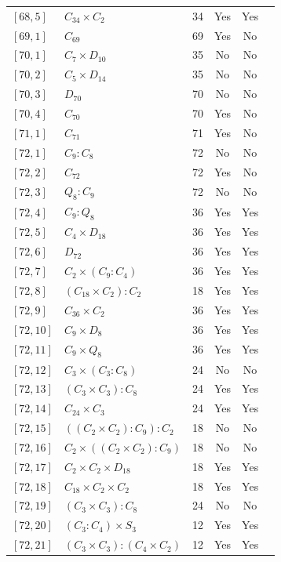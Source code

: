 \documentclass[12pt, a4paper]{article}
\theoremstyle{plain}
\theoremstyle{definition}
\begin{document}
\begin{longtable}{llcccl}
  $[68,5]$ & $C_{34} \times C_2$ & 34 & Yes & Yes \\
  $[69,1]$ & $C_{69}$ & 69 & Yes & No \\
  $[70,1]$ & $C_7 \times D_{10}$ & 35 & No & No \\
  $[70,2]$ & $C_5 \times D_{14}$ & 35 & No & No \\
  $[70,3]$ & $D_{70}$ & 70 & No & No \\
  $[70,4]$ & $C_{70}$ & 70 & Yes & No \\
  $[71,1]$ & $C_{71}$ & 71 & Yes & No \\
  $[72,1]$ & $C_9 : C_8$ & 72 & No & No \\
  $[72,2]$ & $C_{72}$ & 72 & Yes & No \\
  $[72,3]$ & $Q_8 : C_9$ & 72 & No & No \\
  $[72,4]$ & $C_9 : Q_8$ & 36 & Yes & Yes \\
  $[72,5]$ & $C_4 \times D_{18}$ & 36 & Yes & Yes \\
  $[72,6]$ & $D_{72}$ & 36 & Yes & Yes \\
  $[72,7]$ & $C_2 \times (C_9 : C_4)$ & 36 & Yes & Yes \\
  $[72,8]$ & $(C_{18} \times C_2) : C_2$ & 18 & Yes & Yes \\
  $[72,9]$ & $C_{36} \times C_2$ & 36 & Yes & Yes \\
  $[72,10]$ & $C_9 \times D_8$ & 36 & Yes & Yes \\
  $[72,11]$ & $C_9 \times Q_8$ & 36 & Yes & Yes \\
  $[72,12]$ & $C_3 \times (C_3 : C_8)$ & 24 & No & No \\
  $[72,13]$ & $(C_3 \times C_3) : C_8$ & 24 & Yes & Yes \\
  $[72,14]$ & $C_{24} \times C_3$ & 24 & Yes & Yes \\
  $[72,15]$ & $((C_2 \times C_2) : C_9) : C_2$ & 18 & No & No \\
  $[72,16]$ & $C_2 \times ((C_2 \times C_2) : C_9)$ & 18 & No & No \\
  $[72,17]$ & $C_2 \times C_2 \times D_{18}$ & 18 & Yes & Yes \\
  $[72,18]$ & $C_{18} \times C_2 \times C_2$ & 18 & Yes & Yes \\
  $[72,19]$ & $(C_3 \times C_3) : C_8$ & 24 & No & No \\
  $[72,20]$ & $(C_3 : C_4) \times S_3$ & 12 & Yes & Yes \\
  $[72,21]$ & $(C_3 \times C_3) : (C_4 \times C_2)$ & 12 & Yes & Yes \\

\end{longtable}
\end{document}
